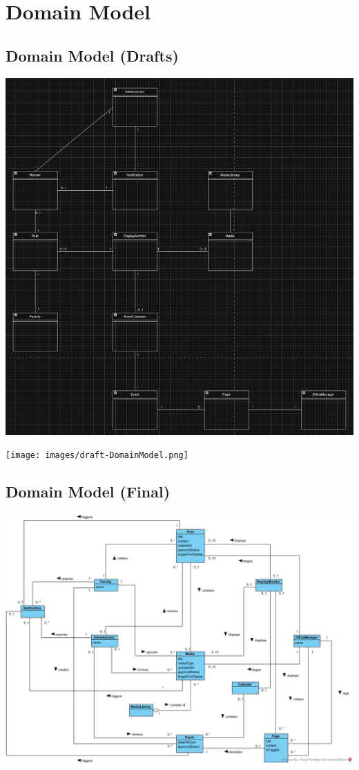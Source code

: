 \documentclass{article}
\begin{document}
\section{Domain Model}
    \subsection{Domain Model (Drafts)}
        \includegraphics[scale=0.9]{images/Initial Domain Model.png}
        \label{fig:Domain Model Draft (version 1)}
    
        \texttt{[image: images/draft-DomainModel.png]}
        \label{fig:Domain Model Draft (version 2}
    
    \subsection{Domain Model (Final)}
     \includegraphics[scale=0.45]{images/DomainModel.jpg}
        \label{fig:Final version of the Domain Model}
\end{document}
